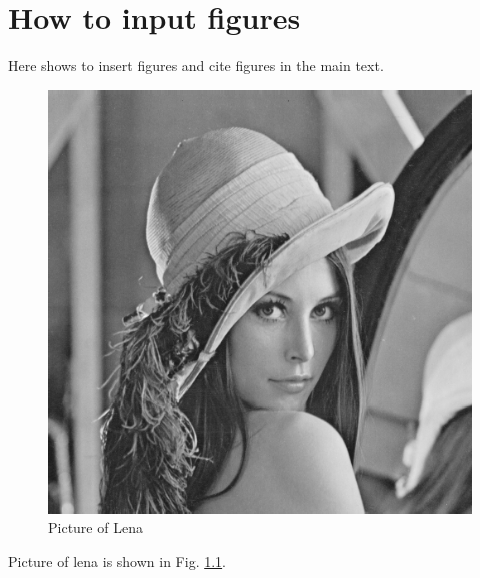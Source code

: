 \chapter{How to input figures}\label{ch:ch2}

Here shows to insert figures and cite figures in the main text.

\begin{figure}[h!]
\centering
\includegraphics[width = 0.85\linewidth]{./figs/ch2/lena.bmp}
\caption{Picture of Lena}
\label{fig:2-fig1}
\end{figure}
Picture of lena is shown in Fig. \ref{fig:2-fig1}.
